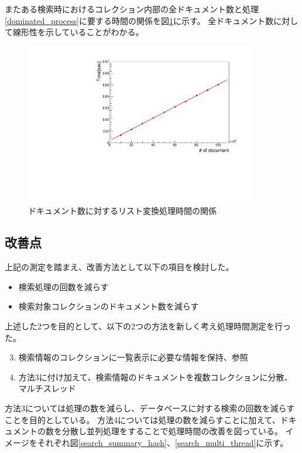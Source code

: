 またある検索時におけるコレクション内部の全ドキュメント数と処理\ref{dominated_process}に要する時間の関係を図\ref{dominated_process_relation}に示す。
全ドキュメント数に対して線形性を示していることがわかる。
\begin{figure}[bpt]
  \begin{center}
    \includegraphics[width=10cm,angle=270]{dominated_process_relation.pdf}
  \caption[ドキュメント数に対するリスト変換処理時間の関係]{ドキュメント数に対するリスト変換処理時間の関係}
  \label{dominated_process_relation}
  \end{center}
\end{figure}

\subsection{改善点}
上記の測定を踏まえ、改善方法として以下の項目を検討した。
\begin{itemize}
  \item 検索処理の回数を減らす
  \item 検索対象コレクションのドキュメント数を減らす
\end{itemize}

上述した2つを目的として、以下の2つの方法を新しく考え処理時間測定を行った。

\begin{enumerate}
  \setcounter{enumi}{2}
  \item 検索情報のコレクションに一覧表示に必要な情報を保持、参照 
  \item 方法3に付け加えて、検索情報のドキュメントを複数コレクションに分散、マルチスレッド
\end{enumerate}

方法3については処理の数を減らし、データベースに対する検索の回数を減らすことを目的としている。
方法4については処理の数を減らすことに加えて、ドキュメントの数を分散し並列処理をすることで処理時間の改善を図っている。
イメージをそれぞれ図\ref{search_summary_hash}、\ref{search_multi_thread}に示す。

